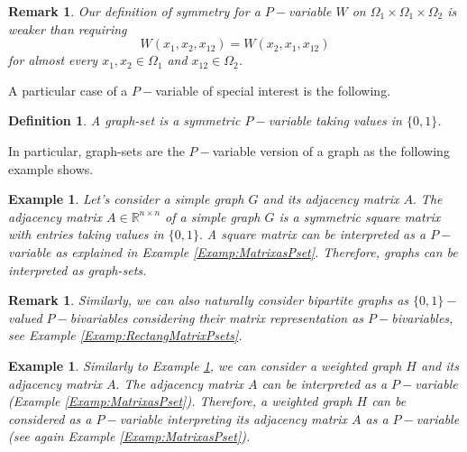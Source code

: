 \documentclass[11pt]{article}
\newtheorem{definition}[theorem]{Definition}
\newtheorem{example}[theorem]{Example}
\newtheorem{remark}[theorem]{Remark}
\def\R{\mathbb{R}}
\begin{document}
\begin{remark}
Our definition of symmetry for a $P-$variable $W$ on $\Omega_1\times \Omega_1\times \Omega_2$ is weaker than requiring $$
W(x_1,x_2,x_{12})=W(x_2,x_1,x_{12})
$$ for almost every $x_1,x_2\in \Omega_1$ and $x_{12}\in \Omega_2$.    
\end{remark}
A particular case of a $P-$variable of special interest is the following.
\begin{definition}
A \emph{graph-set} is a symmetric $P-$variable taking values in $\{0,1\}$. 
\end{definition}

In particular, graph-sets are the $P-$variable version of a graph as the following example shows.

\begin{example}\label{ExGraphasGraphset}
Let's consider a simple graph $G$ and its adjacency matrix $A.$ The adjacency matrix $A\in \R^{n\times n}$ of a simple graph $G$ is a symmetric square matrix with entries taking values in $\{0,1\}.$ A square matrix can be interpreted as a $P-$variable as explained in Example \ref{Examp:MatrixasPset}. Therefore, graphs can be interpreted as graph-sets.
\end{example}

\begin{remark}
Similarly, we can also naturally consider bipartite graphs as $\{0,1\}-$valued $P-$bivariables considering their matrix representation as $P-$bivariables, see Example \ref{Examp:RectangMatrixPsets}.
\end{remark}

\begin{example}
\label{ExGraphasPsets}
Similarly to Example \ref{ExGraphasGraphset}, we can consider a weighted graph $H$ and its adjacency matrix $A.$ The adjacency matrix $A$ can be interpreted as a $P-$variable (Example \ref{Examp:MatrixasPset}). Therefore, a weighted graph $H$ can be considered as a $P-$variable interpreting  its adjacency matrix $A$ as a $P-$variable (see again Example \ref{Examp:MatrixasPset}). 
\end{example}
\end{document}
